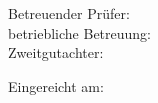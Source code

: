 {\begin{textblock*}{\textwidth}
\begin{minipage}[b]{\textwidth}
        Betreuender Prüfer: \IfirstSv \\
        \ifdefined\IisTermPaper
        \else
          \ifdefined\IisInternshipReport
        betriebliche Betreuung: \IsecondSv \\							
	  \else
        Zweitgutachter: \IsecondSv \\
        \fi\fi

        Eingereicht am: \ISubDate \\
      \fi
    \end{minipage}
  \end{textblock*}
}
